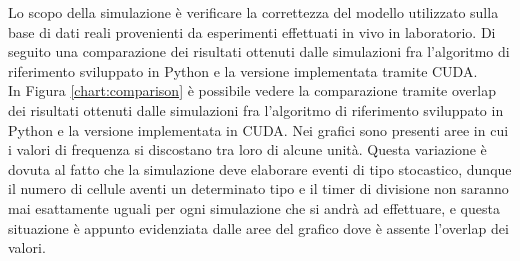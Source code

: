 Lo scopo della simulazione è verificare la correttezza del modello utilizzato
sulla base di dati reali provenienti da esperimenti effettuati in vivo
in laboratorio.
Di seguito una comparazione dei risultati ottenuti dalle simulazioni fra
l'algoritmo di riferimento sviluppato in Python e la versione implementata
tramite CUDA.
\\
In Figura \ref{chart:comparison} è possibile vedere la comparazione tramite 
overlap dei
risultati ottenuti dalle simulazioni fra l'algoritmo di riferimento sviluppato
in Python e la versione implementata in CUDA.
Nei grafici sono presenti aree in cui
i valori di frequenza si discostano tra loro di alcune unità. Questa variazione
è dovuta al fatto che la simulazione deve elaborare eventi di tipo stocastico,
dunque il numero di cellule aventi un determinato tipo e il timer di divisione
non saranno mai esattamente uguali per ogni simulazione che si andrà ad
effettuare, e questa situazione è appunto evidenziata dalle aree del grafico
dove è assente l'overlap dei valori. 
